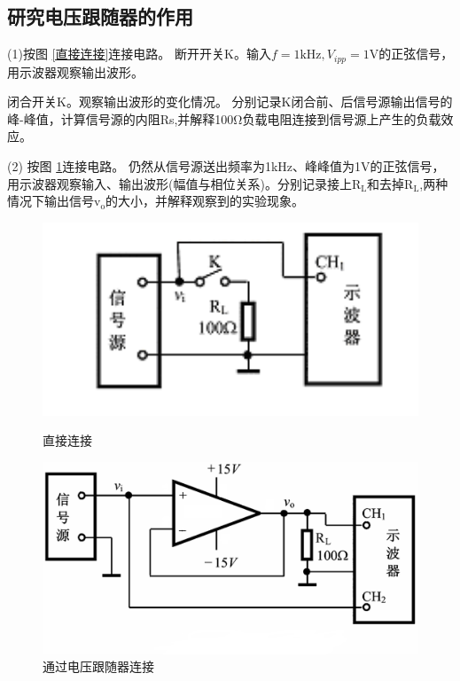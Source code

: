 \documentclass[a4paper]{article}
\theoremstyle{definition}
\theoremstyle{plain}
\theoremstyle{remark}
\newcommand{\reffig}[1]{图 \ref{#1}}
\begin{document}
\subsection{研究电压跟随器的作用}

(1)按\reffig{直接连接}连接电路。
断开开关K。输入$f=1 \mathrm{kHz},V_{ipp}=1 \mathrm{V}$的正弦信号，用示波器观察输出波形。

闭合开关K。观察输出波形的变化情况。
分别记录K闭合前、后信号源输出信号的峰-峰值，计算信号源的内阻Rs,并解释100Ω负载电阻连接到信号源上产生的负载效应。


(2) 按\reffig{通过电压跟随器连接}连接电路。
仍然从信号源送出频率为1kHz、峰峰值为1V的正弦信号，用示波器观察输入、输出波形(幅值与相位关系)。分别记录接上$\mathrm{R_L}$和去掉$\mathrm{R_L}$,两种情况下输出信号$\mathrm{v_o}$的大小，并解释观察到的实验现象。


\begin{figure}[H]
	\begin{minipage}[t]{0.5\linewidth}
		\centering
		\includegraphics[width=1\textwidth]{直接连接}
		\caption{直接连接}
		\label{直接连接}
	\end{minipage}%
	\begin{minipage}[t]{0.5\linewidth}
		\centering
		\includegraphics[width=1\textwidth]{通过电压跟随器连接}
		\caption{通过电压跟随器连接}
		\label{通过电压跟随器连接}
	\end{minipage}
\end{figure}
\end{document}

